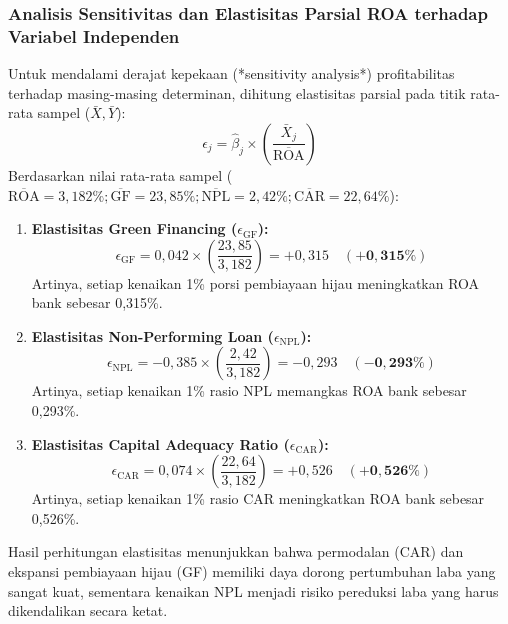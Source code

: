 \documentclass[12pt,a4paper]{article}
\numberwithin{equation}{section}
\begin{document}
\subsubsection{Analisis Sensitivitas dan Elastisitas Parsial ROA terhadap Variabel Independen}
\noindent
Untuk mendalami derajat kepekaan (*sensitivity analysis*) profitabilitas terhadap masing-masing determinan, dihitung elastisitas parsial pada titik rata-rata sampel ($\bar{X}, \bar{Y}$):
\begin{equation}
  \epsilon_j = \hat{\beta}_j \times \left( \frac{\bar{X}_j}{\overline{\text{ROA}}} \right)
\end{equation}
Berdasarkan nilai rata-rata sampel ($\overline{\text{ROA}} = 3{,}182\%; \overline{\text{GF}} = 23{,}85\%; \overline{\text{NPL}} = 2{,}42\%; \overline{\text{CAR}} = 22{,}64\%$):
\begin{enumerate}
  \item \textbf{Elastisitas Green Financing ($\epsilon_{\text{GF}}$):}
    \begin{equation}
      \epsilon_{\text{GF}} = 0{,}042 \times \left( \frac{23{,}85}{3{,}182} \right) = +0{,}315 \quad (\mathbf{+0{,}315\%})
    \end{equation}
    Artinya, setiap kenaikan 1\% porsi pembiayaan hijau meningkatkan ROA bank sebesar 0,315\%.
  \item \textbf{Elastisitas Non-Performing Loan ($\epsilon_{\text{NPL}}$):}
    \begin{equation}
      \epsilon_{\text{NPL}} = -0{,}385 \times \left( \frac{2{,}42}{3{,}182} \right) = -0{,}293 \quad (\mathbf{-0{,}293\%})
    \end{equation}
    Artinya, setiap kenaikan 1\% rasio NPL memangkas ROA bank sebesar 0,293\%.
  \item \textbf{Elastisitas Capital Adequacy Ratio ($\epsilon_{\text{CAR}}$):}
    \begin{equation}
      \epsilon_{\text{CAR}} = 0{,}074 \times \left( \frac{22{,}64}{3{,}182} \right) = +0{,}526 \quad (\mathbf{+0{,}526\%})
    \end{equation}
    Artinya, setiap kenaikan 1\% rasio CAR meningkatkan ROA bank sebesar 0,526\%.
\end{enumerate}

\noindent
Hasil perhitungan elastisitas menunjukkan bahwa permodalan (CAR) dan ekspansi pembiayaan hijau (GF) memiliki daya dorong pertumbuhan laba yang sangat kuat, sementara kenaikan NPL menjadi risiko pereduksi laba yang harus dikendalikan secara ketat.
\end{document}
